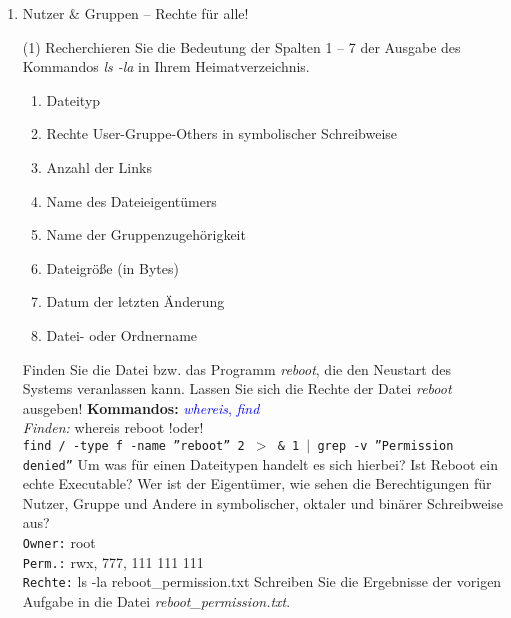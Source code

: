 \documentclass[paper=a4,fontsize=11pt]{scrartcl}%
\numberwithin{equation}{section}
\begin{document}
{\begin{enumerate}
\item Nutzer \& Gruppen -- Rechte für alle!
	\begin{tasks}(1)
        \task Recherchieren Sie die Bedeutung der Spalten 1 -- 7 der Ausgabe des Kommandos \emph{ls -la} in Ihrem Heimatverzeichnis.
         \begin{enumerate}
        		\item Dateityp
        		\item Rechte User-Gruppe-Others in symbolischer Schreibweise
        		\item Anzahl der Links
        		\item Name des Dateieigentümers
        		\item Name der Gruppenzugehörigkeit
        		\item Dateigröße (in Bytes)
        		\item Datum der letzten Änderung
        		\item Datei- oder Ordnername
        \end{enumerate}
        \task Finden Sie die Datei bzw. das Programm \textit{reboot}, die den Neustart des Systems veranlassen kann. Lassen Sie sich die Rechte der Datei \textit{reboot} ausgeben!
        \textbf{Kommandos:} \textcolor{blue}{\emph{whereis}, \emph{find}}\\
        \textit{Finden:} whereis reboot !oder!\\
        \texttt{find / -type f -name ''reboot'' 2 $>$ \& 1 $|$ grep -v ''Permission denied''} 
        \task Um was für einen Dateitypen handelt es sich hierbei? Ist Reboot ein echte Executable?
        \task Wer ist der Eigentümer, wie sehen die Berechtigungen für Nutzer, Gruppe und Andere in symbolischer, oktaler und binärer Schreibweise aus?\\
        \texttt{Owner:} root\\
        \texttt{Perm.:} rwx, 777, 111 111 111\\
        \texttt{Rechte:} ls -la reboot\-\_permission.txt
        \task Schreiben Sie die Ergebnisse der vorigen Aufgabe in die Datei \textit{reboot\-\_permission.txt}.
   

\end{tasks}
\end{enumerate}}
\end{document}

